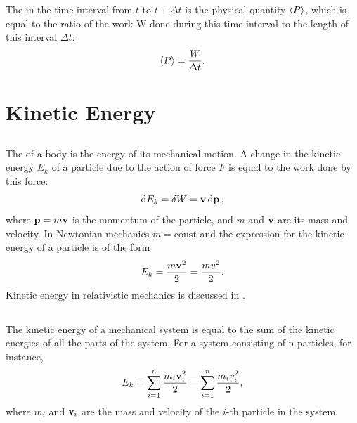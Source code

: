 The  in the time interval from $t$ to $t + \Delta t$ is the physical quantity $\expval{P}
$, which is equal to the ratio of the work W done during this time interval to the length of this inter­val $ \Delta t$:
\begin{equation*}%
\expval{P} = \frac{W}{\Delta t}.
\end{equation*}



\section{Kinetic Energy}
\label{sec-3.2}

\subsection{}\label{3.2.1} The  of a body is the energy of its mechanical motion. A change in the kinetic energy $E_{k}$ of a particle due to the action of force $F$ is equal to the work done by this force:
\begin{equation*}%
\dd{E_{k}} = \delta W = \vb{v} \dd{\vb{p}},
\end{equation*}
where $\vb{p} = m\vb{v}$ is the momentum of the particle, and $m$ and $\vb{v}$ are its mass and velocity. In Newtonian mechanics $m = \textrm{const}$ and the expression for the kinetic energy of a particle is of the form
\begin{equation*}%
E_{k} = \frac{m\vb{v}^{2}}{2} = \frac{mv^{2}}{2}.
\end{equation*}
Kinetic energy in relativistic mechanics is discussed in .


\subsection{}\label{3.2.2} The kinetic energy of a mechanical system is equal to the sum of the kinetic energies of all the parts of the system. For a system consisting of n particles, for instance,
\begin{equation*}%
E_{k} = \sum_{i=1}^{n}\frac{m_{i}\vb{v}^{2}_{i}}{2} =\sum_{i=1}^{n}\frac{m_{i}{v}^{2}_{i}}{2},
\end{equation*}
where $m_{i}$ and $\vb{v}_{i}$ are the mass and velocity of the $i$-th particle in the system.

